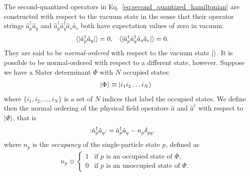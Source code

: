 The second-quantized operators in Eq.\ \eqref{eq:second_quantized_hamiltonian} are constructed with respect to the vacuum state in the sense that their operator strings $\hat{a}_p^\dagger \hat{a}_q$ and $\hat{a}_p^\dagger \hat{a}_q^\dagger \hat{a}_s \hat{a}_r$ both have expectation values of zero in vacuum:
\begin{align*}
&\langle  | \hat{a}_p^\dagger \hat{a}_q |  \rangle = 0, &
&\langle  | \hat{a}_p^\dagger \hat{a}_q^\dagger \hat{a}_s \hat{a}_r |  \rangle = 0.
\end{align*}
They are said to be \emph{normal-ordered} with respect to the vacuum state $|  \rangle$.  It is possible to be normal-ordered with respect to a different state, however.  Suppose we have a Slater determinant $\Phi$ with $N$ occupied states:
\begin{align*}
  | \Phi \rangle \equiv | i_1 i_2 \ldots i_N \rangle
\end{align*}
where $\{i_1, i_2, \ldots, i_N\}$ is a set of $N$ indices that label
the occupied states.  We define then the normal ordering of the
physical field operators $\hat a$ and $\hat a^\dagger$ with respect to
$|\Phi\rangle$, that is
\begin{align*}
  \mathopen: \hat{a}_p^\dagger \hat{a}_q^{} \mathclose: &= \hat{a}_p^\dagger \hat{a}_q^{} - n_p^{} \delta_{p q}^{}.
\end{align*}
where $n_p$ is the \textit{occupancy} of the single-particle state $p$, defined as
\begin{align}
  n_p \equiv \begin{cases}
    1 & \text{if $p$ is an occupied state of $\Phi$}, \\
    0 & \text{if $p$ is an unoccupied state of $\Phi$}.
  \end{cases}
\end{align}

